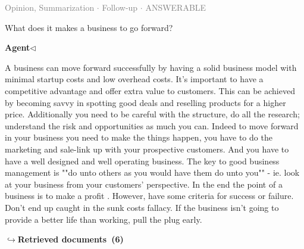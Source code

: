 \documentclass[a4paper,11pt]{article}
\begin{document}
\vspace{0.5em}
\hfill{\tiny\textcolor{gray}{Opinion, Summarization $\cdot$ Follow-up $\cdot$ ANSWERABLE}}
\begin{userbubble}
What does it makes a business to go forward?
\end{userbubble}
\noindent\hfill{\small\textcolor{agentcolor}{\textbf{Agent\enspace$\triangleleft$}}}
\begin{agentbubble}
A business can move forward successfully by having a solid business model with minimal startup costs and low overhead costs. It's important to have a competitive advantage and offer extra value to customers. This can be achieved by becoming savvy in spotting good deals and reselling products for a higher price. Additionally you need to be careful with the structure, do all the research; understand the risk and opportunities as much you can.  Indeed to move forward in your business you need to make the things happen, you have to do the marketing and sale-link up with your prospective customers. And you have to have a well designed and well operating business. The key to good business management is ""do unto others as you would have them do unto you"" - ie. look at your business from your customers' perspective. In the end the point of a business is to make a profit . However, have some criteria for success or failure. Don't end up caught in the sunk costs fallacy. If the business isn't going to provide a better life than working, pull the plug early.
\end{agentbubble}
\noindent\hfill{\footnotesize\textcolor{doccolor}{\textbf{$\hookrightarrow$\enspace Retrieved documents~(6)}}}
\end{document}
